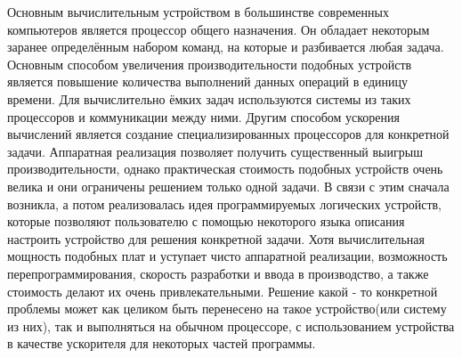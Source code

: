 Основным вычислительным устройством в большинстве современных компьютеров
является процессор общего назначения. Он обладает некоторым
заранее определённым набором команд, на которые и разбивается любая задача.
Основным способом увеличения производительности подобных устройств является
повышение количества выполнений данных операций в единицу времени. Для
вычислительно ёмких задач используются системы из таких процессоров и коммуникации между ними. 
Другим способом ускорения вычислений является создание специализированных
процессоров для конкретной задачи. Аппаратная реализация позволяет получить существенный выигрыш
производительности, однако практическая стоимость подобных устройств очень
велика и они ограничены решением только одной задачи. В связи с этим сначала
возникла, а потом реализовалась идея программируемых логических устройств,
которые позволяют пользователю с помощью некоторого языка описания настроить
устройство для решения конкретной задачи. Хотя вычислительная мощность подобных плат и уступает
чисто аппаратной реализации, возможность
перепрограммирования, скорость разработки и ввода в производство, а также
стоимость делают их очень привлекательными. Решение какой - то конкретной
проблемы может как целиком быть перенесено на такое устройство(или систему из
них), так и выполняться на обычном процессоре, с использованием устройства в
качестве ускорителя для некоторых частей программы.
